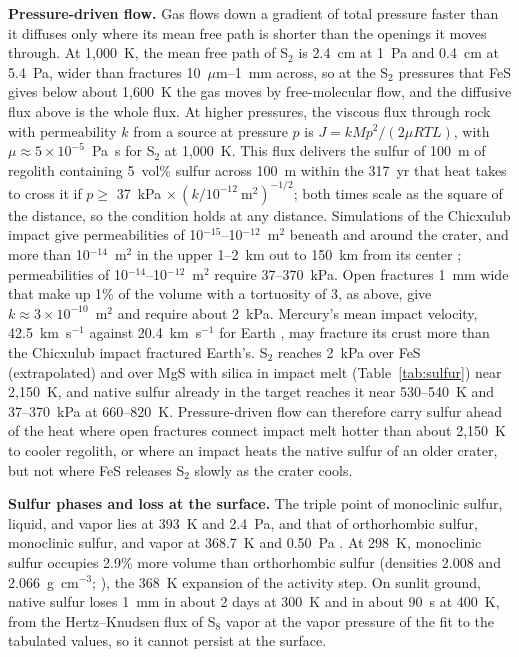 \documentclass{planetary}
\begin{document}
\textbf{Pressure-driven flow.} Gas flows down a gradient of total pressure faster than it diffuses only where its mean free path is shorter than the openings it moves through. At 1,000~K, the mean free path of S$_2$ is 2.4~cm at 1~Pa and 0.4~cm at 5.4~Pa, wider than fractures 10~$\mu$m--1~mm across, so at the S$_2$ pressures that FeS gives below about 1,600~K the gas moves by free-molecular flow, and the diffusive flux above is the whole flux. At higher pressures, the viscous flux through rock with permeability $k$ from a source at pressure $p$ is $J = k M p^2/(2 \mu R T L)$, with $\mu \approx 5 \times 10^{-5}$~Pa~s for S$_2$ at 1,000~K. This flux delivers the sulfur of 100~m of regolith containing 5~vol\% sulfur across 100~m within the 317~yr that heat takes to cross it if $p \geq$ 37~kPa $\times\,(k/10^{-12}~\mathrm{m^2})^{-1/2}$; both times scale as the square of the distance, so the condition holds at any distance. Simulations of the Chicxulub impact give permeabilities of 10$^{-15}$--10$^{-12}$~m$^2$ beneath and around the crater, and more than 10$^{-14}$~m$^2$ in the upper 1--2~km out to 150~km from its center \parencite{alexander2024}; permeabilities of 10$^{-14}$--10$^{-12}$~m$^2$ require 37--370~kPa. Open fractures 1~mm wide that make up 1\% of the volume with a tortuosity of 3, as above, give $k \approx 3 \times 10^{-10}$~m$^2$ and require about 2~kPa. Mercury's mean impact velocity, 42.5~km~s$^{-1}$ against 20.4~km~s$^{-1}$ for Earth \parencite{lefeuvreNonuniformCrateringTerrestrial2008}, may fracture its crust more than the Chicxulub impact fractured Earth's. S$_2$ reaches 2~kPa over FeS (extrapolated) and over MgS with silica in impact melt (Table~\ref{tab:sulfur}) near 2,150~K, and native sulfur already in the target reaches it near 530--540~K and 37--370~kPa at 660--820~K. Pressure-driven flow can therefore carry sulfur ahead of the heat where open fractures connect impact melt hotter than about 2,150~K to cooler regolith, or where an impact heats the native sulfur of an older crater, but not where FeS releases S$_2$ slowly as the crater cools.

\textbf{Sulfur phases and loss at the surface.} The triple point of monoclinic sulfur, liquid, and vapor lies at 393~K and 2.4~Pa, and that of orthorhombic sulfur, monoclinic sulfur, and vapor at 368.7~K and 0.50~Pa \parencite{steudel2003}. At 298~K, monoclinic sulfur occupies 2.9\% more volume than orthorhombic sulfur (densities 2.008 and 2.066~g~cm$^{-3}$; \cite{steudel2003}), the 368~K expansion of the activity step. On sunlit ground, native sulfur loses 1~mm in about 2 days at 300~K and in about 90~s at 400~K, from the Hertz--Knudsen flux of S$_8$ vapor at the vapor pressure of the fit to the tabulated values, so it cannot persist at the surface.
\end{document}
